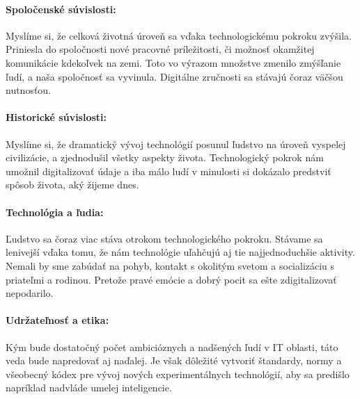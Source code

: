 \documentclass[10pt,twoside,slovak,a4paper]{article}
\begin{document}
\paragraph{Spoločenské súvislosti:}
Myslíme si, že celková životná úroveň sa vďaka technologickému pokroku zvýšila. Priniesla do spoločnosti nové pracovné príležitosti, či možnosť okamžitej komunikácie kdekoľvek na zemi. Toto vo výrazom množstve zmenilo zmýšľanie ľudí, a naša spoločnosť sa vyvinula. Digitálne zručnosti sa stávajú čoraz väčšou nutnosťou.

\paragraph{Historické súvislosti:}
Myslíme si, že dramatický vývoj technológií posunul ľudstvo na úroveň vyspelej civilizácie, a zjednodušil všetky aspekty života. Technologický pokrok nám umožnil digitalizovať údaje a iba málo ludí v minulosti si dokázalo predstviť spôsob života, aký žijeme dnes.

\paragraph{Technológia a ľudia:}
Ľudstvo sa čoraz viac stáva otrokom technologického pokroku. Stávame sa lenivejší  vďaka tomu, že nám technológie uľahčujú aj tie najjednoduchšie aktivity. Nemali by sme zabúdať na pohyb, kontakt s okolitým svetom a socializáciu s priateľmi a rodinou. Pretože pravé emócie a dobrý pocit sa ešte zdigitalizovať nepodarilo.


\paragraph{Udržateľnosť a etika:}
Kým bude dostatočný počet ambicióznych a nadšených ľudí v IT oblasti, táto veda bude napredovať aj naďalej. Je však dôležité vytvoriť štandardy, normy a všeobecný kódex pre vývoj nových experimentálnych technológií, aby sa predišlo napríklad nadvláde umelej inteligencie.



 
\end{document}
